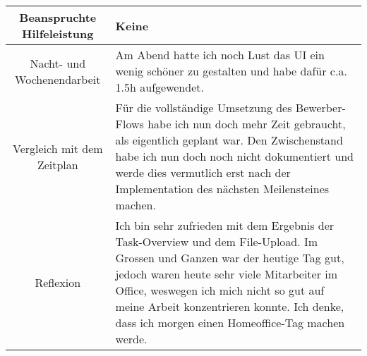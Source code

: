 \begin{tabularx}{\textwidth}[H]{|c|X|}
    Beanspruchte Hilfeleistung &
    Keine
    \\ \hline

    Nacht- und Wochenendarbeit &
    Am Abend hatte ich noch Lust das UI ein wenig schöner zu gestalten und habe dafür c.a. 1.5h aufgewendet.
    \\ \hline

    Vergleich mit dem Zeitplan &
    Für die vollständige Umsetzung des Bewerber-Flows habe ich nun doch mehr Zeit gebraucht, als eigentlich geplant war.
    Den Zwischenstand habe ich nun doch noch nicht dokumentiert und werde dies vermutlich erst nach der Implementation des nächsten
    Meilensteines machen.
    \\ \hline

    Reflexion                  &
    Ich bin sehr zufrieden mit dem Ergebnis der Task-Overview und dem File-Upload. Im Grossen und Ganzen war der heutige Tag gut,
    jedoch waren heute sehr viele Mitarbeiter im Office, weswegen ich mich nicht so gut auf meine Arbeit konzentrieren konnte. Ich denke, dass
    ich morgen einen Homeoffice-Tag machen werde.
    \\ \hline
\end{tabularx}
